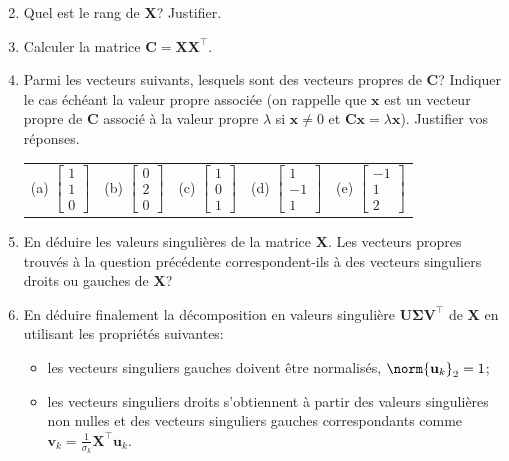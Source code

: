 \documentclass[11pt]{article}
\begin{document}
\begin{enumerate}
	\setcounter{enumi}{1}
	\item Quel est le rang de $\mathbf{X}$? Justifier.
	\item Calculer la matrice $\mathbf{C} = \mathbf{X}\mathbf{X}^\top$.
	\item Parmi les vecteurs suivants, lesquels sont des vecteurs propres de $\mathbf{C}$? Indiquer le cas échéant la valeur propre associée (on rappelle que $\mathbf{x}$ est un vecteur propre de $\mathbf{C}$ associé à la valeur propre $\lambda$ si $\mathbf{x}\neq 0$ et $\mathbf{C}\mathbf{x} = \lambda \mathbf{x}$). Justifier vos réponses.
	
	\begin{tabular}{lllll}
		(a) $\begin{bmatrix} 1 \\ 1 \\ 0 \end{bmatrix}$ & (b) $\begin{bmatrix} 0 \\ 2 \\ 0 \end{bmatrix}$ & (c) $\begin{bmatrix} 1 \\ 0 \\ 1 \end{bmatrix}$ & (d) $\begin{bmatrix} 1 \\ -1 \\ 1 \end{bmatrix}$ & (e) $\begin{bmatrix} -1 \\ 1 \\ 2 \end{bmatrix}$
	\end{tabular}
	
	\item En déduire les valeurs singulières de la matrice $\mathbf{X}$. Les vecteurs propres trouvés à la question précédente correspondent-ils à des vecteurs singuliers droits ou gauches de $\mathbf{X}$?
	\item En déduire finalement la décomposition en valeurs singulière $\mathbf{U}\mathbf{\Sigma}\mathbf{V}^\top$ de $\mathbf{X}$ en utilisant les propriétés suivantes:
	\begin{itemize}
		\item[-] les vecteurs singuliers gauches doivent être normalisés, \ie $\norm{\mathbf{u}_k}_2 = 1$;
		\item[-] les vecteurs singuliers droits s'obtiennent à partir des valeurs singulières non nulles et des vecteurs singuliers gauches correspondants comme $\mathbf{v}_k = \frac{1}{\sigma_k}\mathbf{X}^\top \mathbf{u}_k$.
	\end{itemize}
\end{enumerate}
\end{document}
